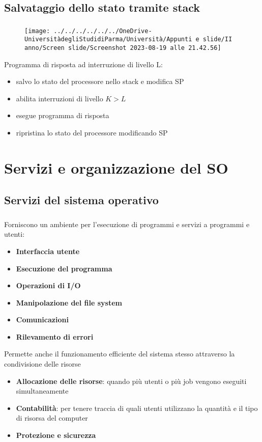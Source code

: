 \documentclass{beamer}
\newenvironment{mainframe}{
	\begin{frame}
		\frametitle{\insertsubsection}
		\framesubtitle{\insertsection}
	}{
	\end{frame}
}
\begin{document}
\subsection{Salvataggio dello stato tramite stack}
\begin{mainframe}
	\begin{figure}
		\centering
		\texttt{[image: ../../../../../../OneDrive-UniversitàdegliStudidiParma/Università/Appunti e slide/II anno/Screen slide/Screenshot 2023-08-19 alle 21.42.56]}
	\end{figure}
\end{mainframe}
\begin{frame}
	Programma di risposta ad interruzione di livello L:
	\begin{itemize}
		\item salvo lo stato del processore nello stack e modifica SP
		\item abilita interruzioni di livello $K>L$
		\item esegue programma di risposta
		\item ripristina lo stato del processore modificando SP
	\end{itemize}
\end{frame}
\section{Servizi e organizzazione del SO}
\subsection{Servizi del sistema operativo}
\begin{mainframe}
	Forniscono un ambiente per l'esecuzione di programmi e servizi a programmi e utenti:
	\begin{itemize}
		\item \textbf{Interfaccia utente}
		\item \textbf{Esecuzione del programma}
		\item \textbf{Operazioni di I/O}
		\item \textbf{Manipolazione del file system}
		\item \textbf{Comunicazioni}
		\item \textbf{Rilevamento di errori}
	\end{itemize}
\end{mainframe}
\begin{frame}
	Permette anche il funzionamento efficiente del sistema stesso attraverso la condivisione delle risorse
	\begin{itemize}
		\item \textbf{Allocazione delle risorse}: quando più utenti o più job vengono eseguiti simultaneamente
		\item \textbf{Contabilità}: per tenere traccia di quali utenti utilizzano la quantità e il tipo di risorsa del computer
		\item \textbf{Protezione e sicurezza}
	\end{itemize}
\end{frame}
\end{document}
